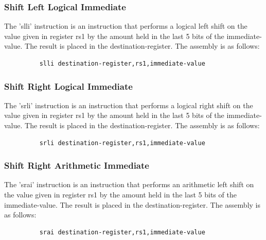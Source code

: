 \documentclass{article}
\begin{document}
\subsubsection{Shift Left Logical Immediate}
\qquad
The 'slli' instruction is an instruction that performs a logical left shift on the value given in register rs1 by the amount held in the last 5 bits of the immediate-value. The result is placed in the destination-register. The assembly is as follows:
\begin{figure}[!htbp]
    \centering
    \begin{verbatim}
    slli destination-register,rs1,immediate-value
    \end{verbatim}
\end{figure}\newline

\subsubsection{Shift Right Logical Immediate}
\qquad
The 'srli' instruction is an instruction that performs a logical right shift on the value given in register rs1 by the amount held in the last 5 bits of the immediate-value. The result is placed in the destination-register. The assembly is as follows:
\begin{figure}[!htbp]
    \centering
    \begin{verbatim}
    srli destination-register,rs1,immediate-value
    \end{verbatim}
\end{figure}\newline

\subsubsection{Shift Right Arithmetic Immediate}
\qquad
The 'srai' instruction is an instruction that performs an arithmetic left shift on the value given in register rs1 by the amount held in the last 5 bits of the immediate-value. The result is placed in the destination-register. The assembly is as follows:
\begin{figure}[!htbp]
    \centering
    \begin{verbatim}
    srai destination-register,rs1,immediate-value
    \end{verbatim}
\end{figure}\newline
\end{document}
